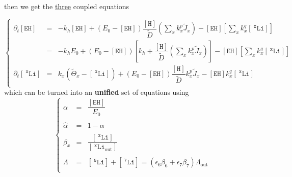 \documentclass[aps,onecolumn,12pt]{revtex4}
\newcommand{\mychem}[1]{\mathtt{#1}}
\newcommand{\myconc}[1]{\left\lbrack{#1}\right\rbrack}
\newcommand{\spLi}[1]{{~^{\mychem{#1}}\mychem{Li}}}
\newcommand{\Li}[1]{\myconc{\spLi{#1}}}
\newcommand{\spLiOut}[1]{{\spLi{#1}}_{\mathrm{out}}}
\newcommand{\LiOut}[1]{\myconc{\spLiOut{#1}}}
\newcommand{\spEHin}{\mychem{EH}}
\newcommand{\EHin}{\myconc{\spEHin}}
\newcommand{\spproton}{\mychem{H}}
\newcommand{\proton}{\myconc{\spproton}}
\newcommand{\LiAll}{\Lambda}
\newcommand{\LiAllOut}{{\LiAll}_{\mathrm{out}}}
\begin{document}
then we get the \underline{three} coupled equations  

\begin{equation}
\left\lbrace
	\begin{array}{rcl}
		\partial_t\EHin & = & -k_h \EHin + \left(E_0- \EHin\right) \dfrac{\proton}{\tilde{D}} \left(\sum_x k_x^p \tilde{J}_x \right)  
		- \EHin \left\lbrack {\sum_x k_x^q \Li{x}} \right\rbrack\\
		& = & 
		-k_h E_0+ \left(E_0- \EHin\right)\left\lbrack k_h+ \dfrac{\proton}{\tilde{D}} \left(\sum_x k_x^p \tilde{J}_x \right)\right] 
		- \EHin \left\lbrack {\sum_x k_x^q \Li{x}} \right\rbrack\\
		\partial_t\Li{x} & = & k_x \left(\tilde{\Theta}_x -\Li{x} \right)  + \left(E_0-\EHin\right) \dfrac{\proton}{\tilde{D}}   k_x^p \tilde{J}_x  - \EHin k_x^q \Li{x}\\
	\end{array}
\right.
\end{equation}
which can be turned into an \textbf{unified} set of equations using
\begin{equation}
\left\lbrace
\begin{array}{rcl}
	\alpha & = & \dfrac{\EHin}{E_0}\\
	\\
	\hat\alpha & = & 1-\alpha\\
	\\
	\beta_x & = & \dfrac{\Li{x}}{\LiOut{x}}\\
	\\
	\Lambda & = & \Li{6} + \Li{7} = \left(\epsilon_6 \beta_6 + \epsilon_7 \beta_7\right) \LiAllOut \\
\end{array}
\right.
\end{equation}
\end{document}
